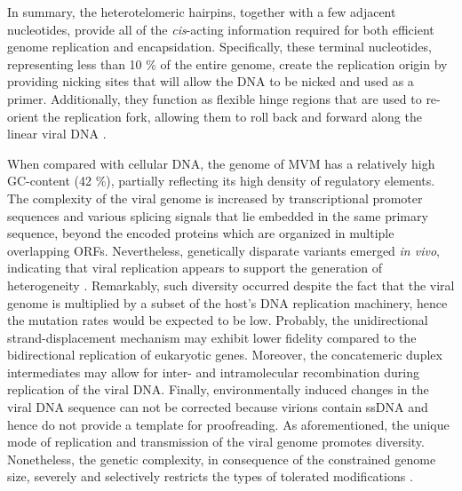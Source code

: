 In summary, the heterotelomeric hairpins, together with a few adjacent nucleotides, provide all of the \textit{cis}-acting information required for both efficient genome replication and encapsidation. Specifically, these terminal nucleotides, representing less than 10 \% of the entire genome, create the replication origin by providing nicking sites that will allow the DNA to be nicked and used as a primer. Additionally, they function as flexible hinge regions that are used to re-orient the replication fork, allowing them to roll back and forward along the linear viral DNA \cite{telomere2, telomere3, handbook}.        

When compared with cellular DNA, the genome of MVM has a relatively high GC-content (42 \%), partially reflecting its high density of regulatory elements. The complexity of the viral genome is increased by transcriptional promoter sequences and various splicing signals that lie embedded in the same primary sequence, beyond the encoded proteins which are organized in multiple overlapping ORFs. Nevertheless, genetically disparate variants emerged \textit{in vivo}, indicating that viral replication appears to support the generation of heterogeneity \cite{pmid12552010}. Remarkably, such diversity occurred despite the fact that the viral genome is multiplied by a subset of the host's DNA replication machinery, hence the mutation rates would be expected to be low. Probably, the unidirectional strand-displacement mechanism may exhibit lower fidelity compared to the bidirectional replication of eukaryotic genes. Moreover, the concatemeric duplex intermediates may allow for inter- and intramolecular recombination during replication of the viral DNA. Finally, environmentally induced changes in the viral DNA sequence can not be corrected because virions contain ssDNA and hence do not provide a template for proofreading. As aforementioned, the unique mode of replication and transmission of the viral genome promotes diversity. Nonetheless, the genetic complexity, in consequence of the constrained genome size, severely and selectively restricts the types of tolerated modifications \cite{telomere}.   


